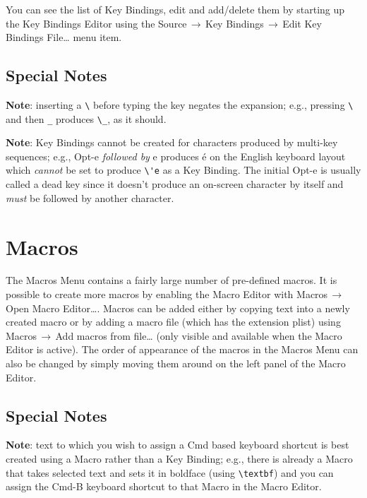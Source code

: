 \documentclass[11pt]{article}
\newcommand{\mnu}[1]{\textsf{#1}}
\newcommand{\cmd}[1]{\textsf{#1}}
\newcommand{\To}{\,\(\to\)\,}
\begin{document}
You can see the list of \cmd{Key Bindings}, edit and add/delete them by starting up the \cmd{Key Bindings Editor} using the \mnu{Source}\To\mnu{Key Bindings}\To\mnu{Edit Key Bindings File…} menu item.

\subsection{Special Notes}

\textbf{Note}: inserting a \verb"\" before typing the key negates the expansion; e.g., pressing \verb"\" and then \verb"_" produces \verb"\_", as it should.
 
\noindent \textbf{Note}: \cmd{Key Bindings} cannot be created for characters produced by multi-key sequences; e.g., \cmd{Opt-e} \emph{followed by} e produces é on the English keyboard layout which \emph{cannot} be set to produce \verb"\'e" as a \cmd{Key Binding}. The initial \cmd{Opt-e} is usually called a \cmd{dead key} since it doesn't produce an on-screen character by itself and \emph{must} be followed by another character.

\section{\cmd{Macros}}

The \mnu{Macros} Menu contains a fairly large number of pre-defined macros. It is possible to create more macros by enabling the Macro Editor with \mnu{Macros}\To\mnu{Open Macro Editor…}. Macros can be added either by copying text into a newly created macro or by adding a macro file (which has the extension \cmd{plist}) using \mnu{Macros}\To\mnu{Add macros from file…} (only visible and available when the Macro Editor is active). The order of appearance of the macros in the \cmd{Macros} Menu can also be changed by simply moving them around on the left panel of the \cmd{Macro Editor}.

\subsection{Special Notes}

\textbf{Note}: text to which you wish to assign a \cmd{Cmd} based keyboard shortcut is best created using a \cmd{Macro} rather than a \cmd{Key Binding}; e.g., there is already a \cmd{Macro} that takes selected text and sets it  in boldface (using \verb"\textbf") and you can assign the \cmd{Cmd-B} keyboard shortcut to that \cmd{Macro} in the \cmd{Macro Editor}.
\end{document}
